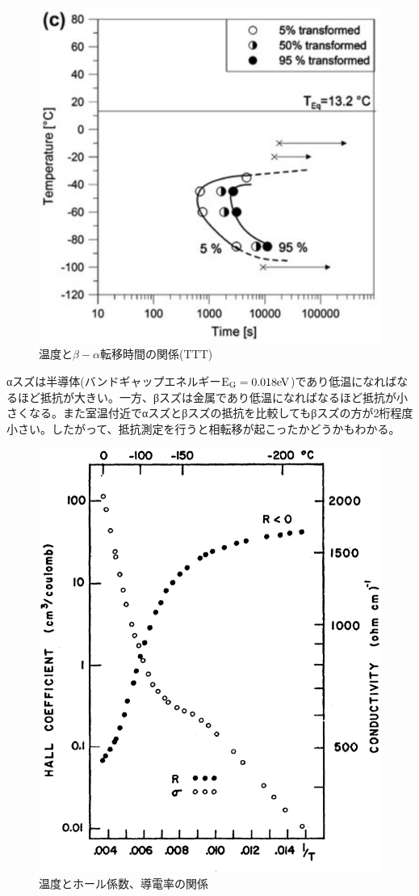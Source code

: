 \begin{figure}[!h]
    \begin{center}
   \includegraphics[width=0.6\hsize]{Introduction/TTT.eps}
  \end{center}
  \caption{温度と$\beta-\alpha$転移時間の関係(TTT)\cite{Nogita}}
  \label{fig:TTT}
\end{figure}

αスズは半導体(バンドギャップエネルギー$\rm E_G=0.018eV$)であり低温になればなるほど抵抗が大きい。一方、βスズは金属であり低温になればなるほど抵抗が小さくなる。また室温付近でαスズとβスズの抵抗を比較してもβスズの方が2桁程度小さい。したがって、抵抗測定を行うと相転移が起こったかどうかもわかる。
\begin{figure}[!h]
    \begin{center}
   \includegraphics[width=0.6\hsize]{Introduction/conductivity.eps}
  \end{center}
  \caption{温度とホール係数、導電率の関係\cite{Kohnke}}
  \label{fig:conductivity}
\end{figure}

